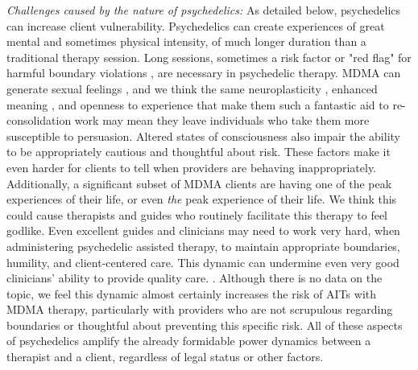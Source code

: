 \documentclass[12pt,letterpaper]{book}
\begin{document}
\textit{Challenges caused by the nature of psychedelics:} As detailed below, psychedelics can increase client vulnerability. Psychedelics can create experiences of great mental and sometimes physical intensity, of much longer duration than a traditional therapy session. Long sessions, sometimes a risk factor or "red flag" for harmful boundary violations \cite{strom1999boundryViolations}, are necessary in psychedelic therapy. MDMA can generate sexual feelings \cite{mcelrath2005sex}, and we think the same neuroplasticity \cite{nardouMDMAPlasticity}, enhanced meaning \cite{hartogsohn2018meaning}, and openness to experience that make them such a fantastic aid to re-consolidation work may mean they leave individuals who take them more susceptible to persuasion. Altered states of consciousness also impair the ability to be appropriately cautious and thoughtful about risk. These factors make it even harder for clients to tell when providers are behaving inappropriately. Additionally, a significant subset of MDMA clients are having one of the peak experiences of their life, or even \textit{the} peak experience of their life. We think this could cause therapists and guides who routinely facilitate this therapy to feel godlike. Even excellent guides and clinicians may need to work very hard, when administering psychedelic assisted therapy, to maintain appropriate boundaries, humility, and client-centered care. This dynamic can undermine even very good clinicians' ability to provide quality care. . Although there is no data on the topic, we feel this dynamic almost certainly increases the risk of AITs with MDMA therapy, particularly with providers who are not scrupulous regarding boundaries or thoughtful about preventing this specific risk. All of these aspects of psychedelics amplify the already formidable power dynamics between a therapist and a client, regardless of legal status or other factors. 
 
\end{document}
